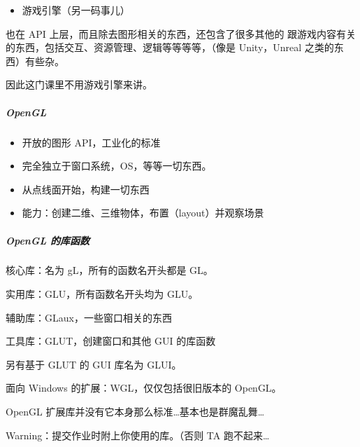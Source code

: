 \documentclass[
]{article}
\begin{document}
\begin{itemize}
\item
  游戏引擎（另一码事儿）
\end{itemize}

也在 API 上层，而且除去图形相关的东西，还包含了很多其他的
跟游戏内容有关的东西，包括交互、资源管理、逻辑等等等等，（像是
Unity，Unreal 之类的东西）有些杂。

因此这门课里不用游戏引擎来讲。

\hypertarget{header-n147}{%
\subparagraph{OpenGL}\label{header-n147}}

\begin{itemize}
\item
  开放的图形 API，工业化的标准
\item
  完全独立于窗口系统，OS，等等一切东西。
\item
  从点线面开始，构建一切东西
\item
  能力：创建二维、三维物体，布置（layout）并观察场景
\end{itemize}

\hypertarget{header-n157}{%
\subparagraph{OpenGL 的库函数}\label{header-n157}}

核心库：名为 gL，所有的函数名开头都是 GL。

实用库：GLU，所有函数名开头均为 GLU。

辅助库：GLaux，一些窗口相关的东西

工具库：GLUT，创建窗口和其他 GUI 的库函数

另有基于 GLUT 的 GUI 库名为 GLUI。

面向 Windows 的扩展：WGL，仅仅包括很旧版本的 OpenGL。

OpenGL 扩展库并没有它本身那么标准\ldots 基本也是群魔乱舞\ldots{}

Warning：提交作业时附上你使用的库。（否则 TA 跑不起来\ldots{}
\end{document}
